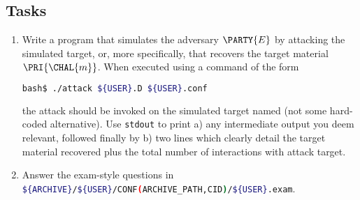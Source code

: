 \documentclass[crop={false},multi={true},tikz={true}]{standalone}
\begin{document}
\subsection{Tasks}

\begin{enumerate}
\item Write a program that simulates the adversary $\PARTY{E}$ by attacking
      the simulated target, or, more specifically, that recovers the target 
      material $\PRI{\CHAL{m}}$.  
      When executed using a command of the form

      \begin{lstlisting}[language={bash},gobble={6}]
      bash$ ./attack ${USER}.D ${USER}.conf
      \end{lstlisting}

      \noindent
      the attack should be invoked on the simulated target named (not some
      hard-coded alternative).  Use \lstinline[language={bash}]{stdout} to 
      print 
      a) any intermediate output you deem relevant, followed finally by 
      b) two lines which clearly detail the target material recovered plus
         the total number of interactions with attack target.
\item Answer the exam-style questions in 
      \lstinline[language={bash}]|${ARCHIVE}/${USER}/CONF(ARCHIVE_PATH,CID)/${USER}.exam|.
\end{enumerate}


\ifstandalone
\printbibliography
\fi
\end{document}
